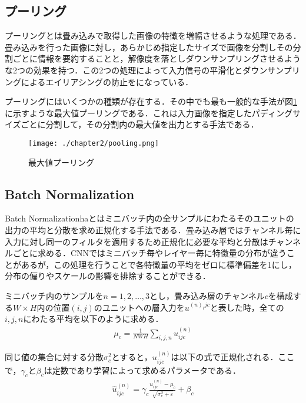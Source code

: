 \subsection{プーリング}
プーリングとは畳み込みで取得した画像の特徴を増幅させるような処理である．畳み込みを行った画像に対し，あらかじめ指定したサイズで画像を分割しその分割ごとに情報を要約することと，解像度を落としダウンサンプリングさせるような2つの効果を持つ．この2つの処理によって入力信号の平滑化とダウンサンプリングによるエイリアシングの防止をになっている．

プーリングにはいくつかの種類が存在する．その中でも最も一般的な手法が図\ref{fig_pooling}に示すような最大値プーリングである．これは入力画像を指定したパディングサイズごとに分割して，その分割内の最大値を出力とする手法である\cite{sinsou}．
\begin{figure}[htbp]
  \begin{center}
    \texttt{[image: ./chapter2/pooling.png]}
    \caption{最大値プーリング}
    \label{fig_pooling}
  \end{center}
\end{figure}

\subsection{Batch Normalization}
Batch Normalizationhaとはミニバッチ内の全サンプルにわたるそのユニットの出力の平均と分散を求め正規化する手法である．畳み込み層ではチャンネル毎に入力に対し同一のフィルタを適用するため正規化に必要な平均と分散はチャンネルごとに求める．CNNではミニバッチ毎やレイヤー毎に特徴量の分布が違うことがあるが，この処理を行うことで各特徴量の平均をゼロに標準偏差を1にし，分布の偏りやスケールの影響を排除することができる．

ミニバッチ内のサンプルを$n=1,2,\ldots,3$とし，畳み込み層のチャンネル$c$を構成する$W\times H$内の位置$(i,j)$のユニットへの層入力を$u^{(n)_ijc}$と表した時，全ての$i,j,n$にわたる平均を以下のように求める．
\begin{align}
  \mu_c = \frac{1}{NWH} \sum_{i,j,n} u^{(n)}_{ijc}
\end{align}

同じ値の集合に対する分散$\sigma^2_c$とすると，$u^{(n)}_{ijc}$は以下の式で正規化される．ここで，$\gamma_c$と$\beta_c$は定数であり学習によって求めるパラメータである．
\begin{align}
  \hat{u}^{(n)}_{ijc} = \gamma_c \frac{u^{(n)}_{ijc} - \mu_c}{\sqrt{\sigma^2_c + \varepsilon}} + \beta_c
\end{align}


